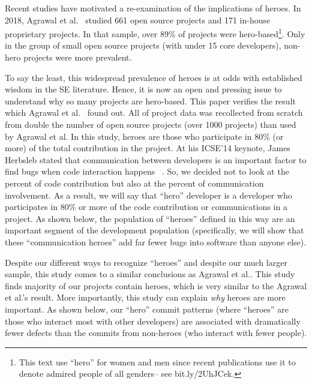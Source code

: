\documentclass[smallextended]{svjour3}
\begin{document}
Recent studies have motivated a re-examination of the implications of heroes.
In 2018,  Agrawal et al.~\cite{Agrawal_2018} studied
 661 open source projects and  171 in-house
 proprietary projects.
 In that sample, over 89\% of projects were hero-based\footnote{This text    use ``hero'' for   women and men since recent publications
 use it to denote admired people of all genders-- see bit.ly/2UhJCek.}. 
Only in the group of small open source projects (with under 15 core developers), non-hero projects were more prevalent. 
  
 

To say the least, this widespread prevalence of heroes is  at odds with established
wisdom in the SE literature\cite{bier2011online,boehm2006view,hislop2002integrating,morcovcomplex,wood2005multiview,ricca2010heroes,robles2006contributor,capiluppi2007adapting}.
Hence, it is now   an open and pressing issue to understand why so many projects are hero-based.
This paper verifies the result which Agrawal et al.~\cite{Agrawal_2018} found out.
All of project data was recollected from scratch from  double the number of open source projects (over 1000   projects) than  used by Agrawal et al.
In this study, heroes are those who participate in 80\% (or more) of the total contribution in the project. At his ICSE'14 keynote,
James Herbsleb stated that communication between developers is an important factor to find bugs when code interaction happens ~\cite{Herbsleb:2014}. So, we decided not to look at the percent of code contribution but also at the percent of communication involvement.  As a result, we will say that   ``hero'' developer
is a developer who participates
in  80\% or more of the code contribution or communications in a project.
As shown below, the population of ``heroes'' defined in this way are an important segment of the development population (specifically, we will show that these ``communication heroes'' add far fewer bugs into software than anyone else).


Despite our different ways to recognize ``heroes'' and despite our much larger sample, this study comes to a
similar conclusions as Agrawal et al..  This study finds  majority of our projects contain heroes, which is very similar to the Agrawal et al.'s result. More importantly, this study can explain {\em why} heroes are more important. As shown below,
our ``hero'' commit patterns (where ``heroes'' are those who interact most with other developers) are
associated with dramatically fewer defects than the commits from non-heroes (who interact with  fewer people).
\end{document}

